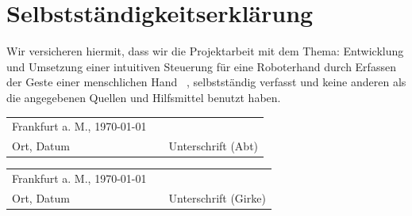 \documentclass[a4paper,12pt,final]{article} %
\numberwithin{equation}{section} %
\numberwithin{figure}{section} %
\numberwithin{table}{section} %
\begin{document}
\section*{Selbstständigkeitserklärung}
Wir versicheren hiermit, dass wir die Projektarbeit mit dem Thema: \glqq Entwicklung und Umsetzung einer intuitiven Steuerung für eine Roboterhand durch Erfassen
der Geste einer menschlichen Hand \grqq\ , selbst\-ständ\-ig verfasst und keine anderen als die angegebenen Quellen und Hilfsmittel benutzt haben.\vspace{2.5cm}
\begin{longtable}{p{5.5cm} p{3cm} p{6cm}}
 Frankfurt a. M., \today& & \\
 \cline{1-1} \cline{3-3}
 Ort, Datum& &Unterschrift (Abt)\\
\end{longtable}
\vspace{0.5cm}
\begin{longtable}{p{5.5cm} p{3cm} p{6cm}}
 Frankfurt a. M., \today& & \\
 \cline{1-1} \cline{3-3}
 Ort, Datum& &Unterschrift (Girke)\\
\end{longtable}
\addtocounter{table}{-1} %
\newpage
\tableofcontents %
\newpage
{}  %
\listoffigures %
\listoftables %
\newpage
{}
\end{document}
